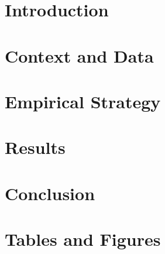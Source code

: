 \documentclass{article}
\begin{document}


\doublespacing


\section{Introduction}
%


\section{Context and Data}
%



\section{Empirical Strategy}
%


\section{Results}
%


\section{Conclusion}
%


\printbibliography

\section{Tables and Figures}
%

\end{document}
